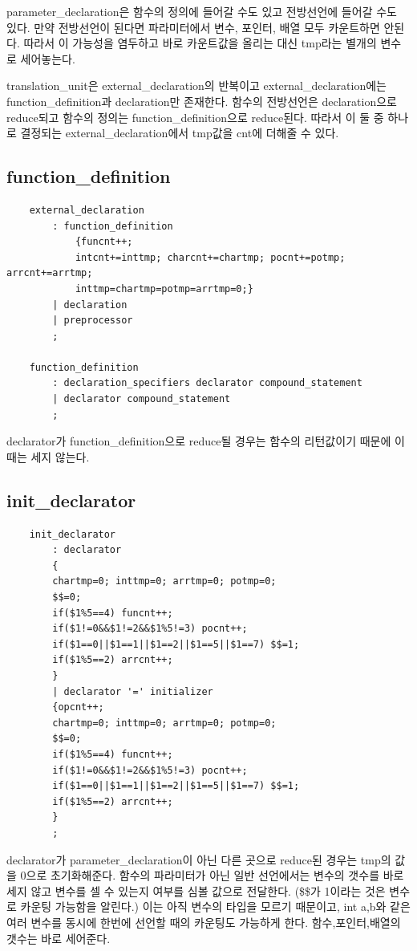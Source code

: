 \documentclass{oblivoir}
\begin{document}
parameter\_declaration은 함수의 정의에 들어갈 수도 있고 전방선언에 들어갈 수도 있다.
만약 전방선언이 된다면 파라미터에서 변수, 포인터, 배열 모두 카운트하면 안된다. 따라서 이 가능성을 염두하고 바로 카운트값을 올리는 대신 tmp라는 별개의 변수로 세어놓는다.

translation\_unit은 external\_declaration의 반복이고 external\_declaration에는 function\_definition과 declaration만 존재한다. 함수의 전방선언은 declaration으로 reduce되고 함수의 정의는 function\_definition으로 reduce된다. 따라서 이 둘 중 하나로 결정되는 external\_declaration에서 tmp값을 cnt에 더해줄 수 있다.


\subsection{function\_definition}
\begin{verbatim}
    external_declaration
        : function_definition 
            {funcnt++; 
            intcnt+=inttmp; charcnt+=chartmp; pocnt+=potmp; arrcnt+=arrtmp;
            inttmp=chartmp=potmp=arrtmp=0;}
        | declaration
        | preprocessor
        ;

    function_definition
        : declaration_specifiers declarator compound_statement
        | declarator compound_statement
        ;

\end{verbatim}
declarator가 function\_definition으로 reduce될 경우는 함수의 리턴값이기 때문에 이 때는 세지 않는다. 

\subsection{init\_declarator}
\begin{verbatim}
    init_declarator
        : declarator
        {
        chartmp=0; inttmp=0; arrtmp=0; potmp=0;
        $$=0;
        if($1%5==4) funcnt++;
        if($1!=0&&$1!=2&&$1%5!=3) pocnt++;
        if($1==0||$1==1||$1==2||$1==5||$1==7) $$=1; 
        if($1%5==2) arrcnt++;
        }
        | declarator '=' initializer
        {opcnt++;
        chartmp=0; inttmp=0; arrtmp=0; potmp=0;
        $$=0;
        if($1%5==4) funcnt++;
        if($1!=0&&$1!=2&&$1%5!=3) pocnt++;
        if($1==0||$1==1||$1==2||$1==5||$1==7) $$=1;
        if($1%5==2) arrcnt++;
        }
        ;
\end{verbatim}
declarator가 parameter\_declaration이 아닌 다른 곳으로 reduce된 경우는 tmp의 값을 0으로 초기화해준다.
함수의 파라미터가 아닌 일반 선언에서는 변수의 갯수를 바로 세지 않고 변수를 셀 수 있는지 여부를 심볼 값으로 전달한다. (\$\$가 1이라는 것은 변수로 카운팅 가능함을 알린다.) 이는 아직 변수의 타입을 모르기 때문이고, int a,b와 같은 여러 변수를 동시에 한번에 선언할 때의 카운팅도 가능하게 한다.
함수,포인터,배열의 갯수는 바로 세어준다.
\end{document}
